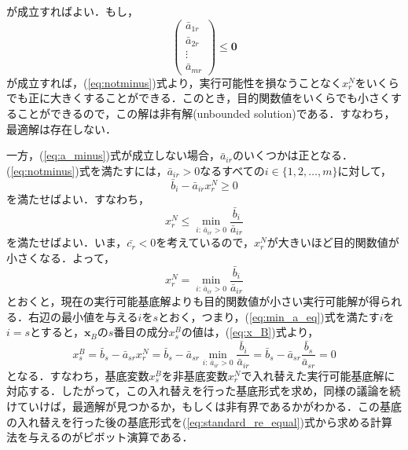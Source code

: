 \documentclass{jsreport}
\begin{document}
が成立すればよい．もし，
\begin{equation}\label{eq:a_minus}
  \left(
  \begin{array}{c}
    \bar{a}_{1r} \\
    \bar{a}_{2r} \\
    \vdots \\
    \bar{a}_{mr}
  \end{array}
  \right) \leq \bm{0}
\end{equation}
が成立すれば，(\ref{eq:notminus})式より，実行可能性を損なうことなく$x_r^N$をいくらでも正に大きくすることができる．このとき，目的関数値をいくらでも小さくすることができるので，この解は非有解(unbounded solution)である．すなわち，最適解は存在しない．

一方，(\ref{eq:a_minus})式が成立しない場合，$\bar{a}_{ir}$のいくつかは正となる．(\ref{eq:notminus})式を満たすには，$\bar{a}_{ir} > 0$なるすべての$i \in \{1, 2, \ldots, m\}$に対して，
\begin{equation}\label{eq:bax}
  \bar{b}_i - \bar{a}_{ir} x_r^N \geq 0
\end{equation}
を満たせばよい．すなわち，
\begin{equation}\label{eq:min_a}
  x_r^N \leq \min_{i: \, \bar{a}_{ir} > 0} \frac{\bar{b}_i}{\bar{a}_{ir}}
\end{equation}
を満たせばよい．いま，$\bar{c_r} < 0$を考えているので，$x_r^N$が大きいほど目的関数値が小さくなる．よって，
\begin{equation}\label{eq:min_a_eq}
  x_r^N = \min_{i: \, \bar{a}_{ir} > 0} \frac{\bar{b}_i}{\bar{a}_{ir}}
\end{equation}
とおくと，現在の実行可能基底解よりも目的関数値が小さい実行可能解が得られる．右辺の最小値を与える$i$を$s$とおく，つまり，(\ref{eq:min_a_eq})式を満たす$i$を$i = s$とすると，$\bm{x}_B$の$s$番目の成分$x_s^B$の値は，(\ref{eq:x_B})式より，
\begin{equation}
  x_s^B = \bar{b}_s - \bar{a}_{sr} x_r^N = \bar{b}_s - \bar{a}_{sr} \min_{i: \, \bar{a}_{ir} > 0} \frac{\bar{b}_i}{\bar{a}_{ir}} = \bar{b}_s - \bar{a}_{sr} \frac{\bar{b}_s}{\bar{a}_{sr}} = 0
\end{equation}
となる．すなわち，基底変数$x_s^B$を非基底変数$x_r^N$で入れ替えた実行可能基底解に対応する．したがって，この入れ替えを行った基底形式を求め，同様の議論を続けていけば，最適解が見つかるか，もしくは非有界であるかがわかる．この基底の入れ替えを行った後の基底形式を(\ref{eq:standard_re_equal})式から求める計算法を与えるのがピボット演算である．
\end{document}
